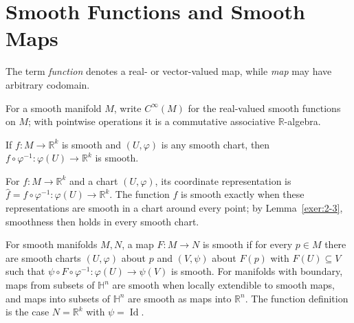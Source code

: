 

\section{Smooth Functions and Smooth Maps}

\begin{remark}
\label{rem:2-8-extra-1}
\mathlibok
The term \emph{function} denotes a real- or vector-valued map, while \emph{map} may have arbitrary codomain.
\end{remark}

\begin{notation}
\label{not:2-8-extra-3}
\mathlibok
For a smooth manifold $M$, write $C^\infty(M)$ for the real-valued smooth
functions on $M$; with pointwise operations it is a commutative associative
$\mathbb R$-algebra.
\end{notation}


\begin{lemma}
\label{exer:2-3}
\leanok
{}
If $f:M\to\mathbb R^k$ is smooth and $(U,\varphi)$ is any smooth chart, then $f\circ\varphi^{-1}:\varphi(U)\to\mathbb R^k$ is smooth.
\end{lemma}

\begin{definition}
\label{def:2-8-extra-4}
\mathlibok
For $f:M\to\mathbb R^k$ and a chart $(U,\varphi)$, its coordinate representation is $\widehat f=f\circ\varphi^{-1}:\varphi(U)\to\mathbb R^k$. The function $f$ is smooth exactly when these representations are smooth in a chart around every point; by Lemma~\ref{exer:2-3}, smoothness then holds in every smooth chart.
\end{definition}

\begin{definition}
\label{def:2-8-extra-5}
\mathlibok
For smooth manifolds $M,N$, a map $F:M\to N$ is smooth if for every $p\in M$ there are smooth charts $(U,\varphi)$ about $p$ and $(V,\psi)$ about $F(p)$ with $F(U)\subseteq V$ such that $\psi\circ F\circ\varphi^{-1}:\varphi(U)\to\psi(V)$ is smooth. For manifolds with boundary, maps from subsets of $\mathbb H^n$ are smooth when locally extendible to smooth maps, and maps into subsets of $\mathbb H^n$ are smooth as maps into $\mathbb R^n$. The function definition is the case $N=\mathbb R^k$ with $\psi=\operatorname{Id}$.
\end{definition}

